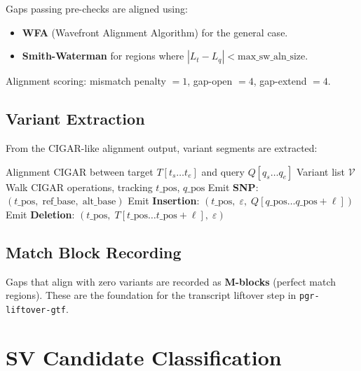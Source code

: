 \documentclass[11pt,a4paper]{article}
\begin{document}
Gaps passing pre-checks are aligned using:
\begin{itemize}[noitemsep]
  \item \textbf{WFA} (Wavefront Alignment Algorithm) for the general case.
  \item \textbf{Smith-Waterman} for regions where $|L_t - L_q| < \text{max\_sw\_aln\_size}$.
\end{itemize}

Alignment scoring: mismatch penalty $= 1$, gap-open $= 4$, gap-extend $= 4$.

\subsection{Variant Extraction}

From the CIGAR-like alignment output, variant segments are extracted:

\begin{algorithm}[H]
\caption{Variant extraction from alignment}
\begin{algorithmic}[1]
\Require Alignment CIGAR between target $T[t_s\ldots t_e]$ and query $Q[q_s\ldots q_e]$
\Ensure Variant list $\mathcal{V}$
\State Walk CIGAR operations, tracking $t\_\text{pos}$, $q\_\text{pos}$
    \State Emit \textbf{SNP}: $(t\_\text{pos},\; \text{ref\_base},\; \text{alt\_base})$
    \State Emit \textbf{Insertion}: $(t\_\text{pos},\; \varepsilon,\; Q[q\_\text{pos}\ldots q\_\text{pos}+\ell])$
    \State Emit \textbf{Deletion}: $(t\_\text{pos},\; T[t\_\text{pos}\ldots t\_\text{pos}+\ell],\; \varepsilon)$
  \EndIf
\EndFor
\end{algorithmic}
\end{algorithm}

\subsection{Match Block Recording}

Gaps that align with zero variants are recorded as \textbf{M-blocks}
(perfect match regions).  These are the foundation for the transcript
liftover step in \texttt{pgr-liftover-gtf}.

\section{SV Candidate Classification}
\label{sec:svcnd}
\end{document}

